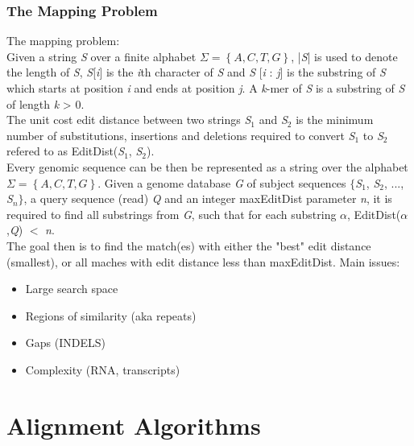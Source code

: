 \documentclass[pdf]{beamer}
\begin{document}
\begin{frame}[allowframebreaks]
\frametitle{The Mapping Problem}
The mapping problem:\\
\vspace{0.1in}
Given a string \textit{S} over a finite alphabet $\Sigma = \left\{A,C,T,G\right\}$, |\textit{S}| is used to
denote the length of \textit{S}, \textit{S}[\textit{i}] is the \textit{i}th character of \textit{S} and \textit{S} [\textit{i} : \textit{j}] is the substring
of \textit{S} which starts at position \textit{i} and ends at position \textit{j}. A \textit{k}-mer of \textit{S} is a
substring of \textit{S} of length \textit{k} > 0.\\
\vspace{0.1in}
The unit cost edit distance between two strings \textit{S}$_1$ and \textit{S}$_2$ is the minimum number of
substitutions, insertions and deletions required to convert
\textit{S}$_1$ to \textit{S}$_2$ refered to as EditDist(\textit{S}$_1$, \textit{S}$_2$).\\
\vspace{0.1in}
Every genomic sequence can be then be represented as a string over the alphabet $\Sigma = \left\{A,C,T,G\right\}$.
Given a genome database \textit{G} of subject sequences $\{$\textit{S}$_1$, \textit{S}$_2$, ..., \textit{S}$_n\}$,
a query sequence (read) \textit{Q} and an integer maxEditDist parameter \textit{n}, it is required to
find all substrings from \textit{G}, such that for each substring $\alpha$, EditDist($\alpha$,\textit{Q}) $<$ \textit{n}.
\\
\vspace{0.1in}
The goal then is to find the match(es) with either the "best" edit distance (smallest), or all maches with edit distance less than maxEditDist.
\vspace{0.1in}
Main issues:\\
\vspace{0.1in}
\begin{itemize}
\item Large search space
\item Regions of similarity (aka repeats)
\item Gaps (INDELS)
\item Complexity (RNA, transcripts)
\end{itemize}
\end{frame}

\section{Alignment Algorithms}
\end{document}

